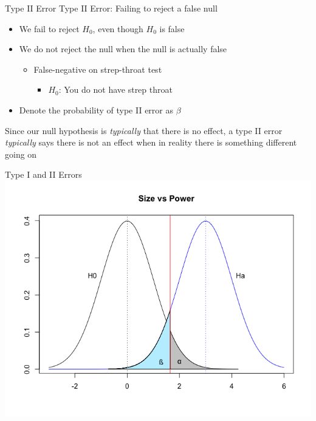 \documentclass{beamer}
\begin{document}
\begin{frame}{Type II Error}
	\alert{Type II Error}: Failing to reject a false null
	
	\begin{itemize} 
		\item We fail to reject $H_0$, even though $H_0$ is false
		      
		\item We do not reject the null when the null is actually false
		      \begin{itemize}
		      	\item False-negative on strep-throat test
		      	      \begin{itemize}
		      	      	\item $H_0$: You do not have strep throat
		      	      \end{itemize}
		      \end{itemize}
		      
		\item Denote the probability of type II error as $\beta$

	\end{itemize}
	
	Since our null hypothesis is \textit{typically} that there is no effect, a type II error \textit{typically} says there is not an effect when in reality there is something different going on 
\end{frame}

\begin{frame}{Type I and II Errors}
	\centering\includegraphics[width=.8\textwidth]{sizevspowerab.png}
\end{frame}
\end{document}
